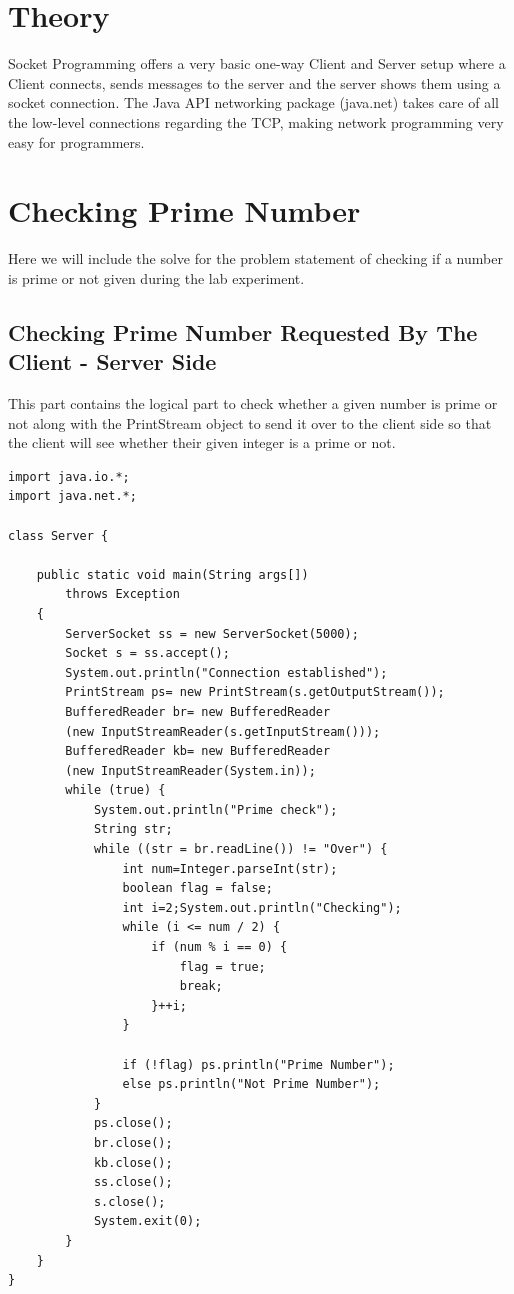 \documentclass[11pt]{article}
\begin{document}
\section{Theory}
Socket Programming offers a very basic one-way Client and Server setup where a Client connects, sends messages to the server and the server shows them using a socket connection. The Java API networking package (java.net) takes care of all the low-level connections regarding the TCP, making network programming very easy for programmers.




\section{Checking Prime Number}
Here we will include the solve for the problem statement of checking if a number is prime or not given during the lab experiment.
\newpage
\subsection{Checking Prime Number Requested By The Client - Server Side }
This part contains the logical part to check whether a given number is prime or not along with the PrintStream object to send it over to the client side so that the client will see whether their given integer is a prime or not.
\

\begin{verbatim}
import java.io.*;
import java.net.*;

class Server {

	public static void main(String args[])
		throws Exception
	{
		ServerSocket ss = new ServerSocket(5000);
		Socket s = ss.accept();
		System.out.println("Connection established");
		PrintStream ps= new PrintStream(s.getOutputStream());
		BufferedReader br= new BufferedReader
		(new InputStreamReader(s.getInputStream()));
		BufferedReader kb= new BufferedReader
		(new InputStreamReader(System.in));
		while (true) {
			System.out.println("Prime check");
			String str;
			while ((str = br.readLine()) != "Over") {
				int num=Integer.parseInt(str);
				boolean flag = false;
				int i=2;System.out.println("Checking");
				while (i <= num / 2) {
					if (num % i == 0) {
						flag = true;
						break;
					}++i;
				}

				if (!flag) ps.println("Prime Number");
				else ps.println("Not Prime Number");	
			}
			ps.close();
			br.close();
			kb.close();
			ss.close();
			s.close();
			System.exit(0);
		} 
	}
}

\end{verbatim}
\end{document}
